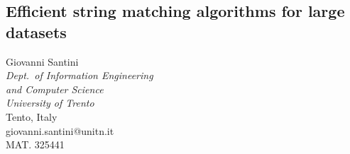 \documentclass[12pt]{article}
\begin{document}
\fontsize{9}{10}\selectfont  %

\begin{center}
\section*{\huge{\sffamily Efficient string matching algorithms for large datasets}}
Giovanni Santini \\
\textit{Dept.\ of Information Engineering \\
and Computer Science} \\
\textit{University of Trento} \\
Tento, Italy \\
giovanni.santini@unitn.it \\
MAT. 325441
\end{center}

\bigskip
\end{document}
